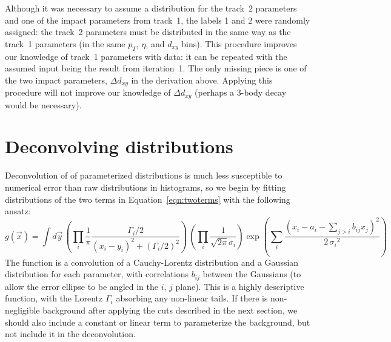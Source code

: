 \documentclass[12pt]{article}
\begin{document}
Although it was necessary to assume a distribution for the track~2
parameters and one of the impact parameters from track~1, the labels 1
and 2 were randomly assigned: the track~2 parameters must be
distributed in the same way as the track~1 parameters (in the same
$p_T$, $\eta$, and $d_{xy}$ bins).  This procedure improves our
knowledge of track~1 parameters with data: it can be repeated with the
assumed input being the result from iteration~1.  The only missing
piece is one of the two impact parameters, $\Delta d_{xy}$ in the
derivation above.  Applying this procedure will not improve our
knowledge of $\Delta d_{xy}$ (perhaps a 3-body decay would be
necessary).

\section{Deconvolving distributions}

Deconvolution of of parameterized distributions is much less
susceptible to numerical error than raw distributions in histograms,
so we begin by fitting distributions of the two terms in
Equation~\ref{eqn:twoterms} with the following ansatz:
\begin{equation}
g(\vec{x}) = \int d\vec{y} \, \left(\prod_i \frac{1}{\pi}\frac{\Gamma_i/2}{(x_i - y_i)^2 + (\Gamma_i/2)^2}\right)
\, \left(\prod_i \frac{1}{\sqrt{2\pi} \sigma_i} \right)\exp\left(\sum_i \frac{(x_i - a_i - \sum_{j>i} b_{ij} x_j)^2}{2 \, {\sigma_i}^2} \right)
\label{eqn:ansatz}
\end{equation}
The function is a convolution of a Cauchy-Lorentz distribution and a
Gaussian distribution for each parameter, with correlations $b_{ij}$ between
the Gaussians (to allow the error ellipse to be angled in the $i$, $j$
plane).  This is a highly descriptive function, with the Lorentz
$\Gamma_i$ absorbing any non-linear tails.  If there is non-negligible
background after applying the cuts described in the next section, we
should also include a constant or linear term to parameterize the
background, but not include it in the deconvolution.
\end{document}
